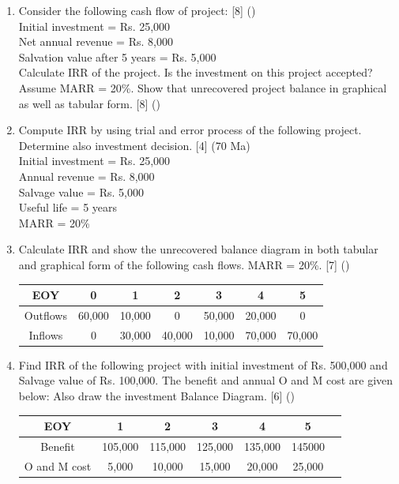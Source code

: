 \documentclass[12pt]{article}
\begin{document}
\begin{enumerate}
				\item Consider the following cash flow of project: \hfill [8] ()\\
				Initial investment = Rs. 25,000\\
				Net annual revenue = Rs. 8,000\\
				Salvation value after 5 years = Rs. 5,000\\
				Calculate IRR of the project. Is the investment on this project accepted?\\
				Assume MARR = 20\%. Show that unrecovered project balance in graphical as well as tabular form. \hfill [8] ()

				\item Compute IRR by using trial and error process of the following project. Determine also investment decision. \hfill [4] (70 Ma)\\
				Initial investment = Rs. 25,000\\
				Annual revenue = Rs. 8,000\\
				Salvage value = Rs. 5,000\\
				Useful life = 5 years\\
				MARR = 20\%	
				
				\item Calculate IRR and show the unrecovered balance diagram in both tabular and graphical form of the following cash flows. MARR = 20\%. \hfill [7] ()
				\begin{tabular}{|c|c|c|c|c|c|c|}
					\hline
					EOY & 0 & 1 & 2 & 3 & 4 & 5\\ \hline
					Outflows & 60,000 & 10,000 & 0 & 50,000 & 20,000 & 0\\ \hline
					Inflows & 0 & 30,000 & 40,000 & 10,000 & 70,000 & 70,000\\ \hline
				\end{tabular}
				
				\item Find IRR of the following project with initial investment of Rs. 500,000 and Salvage value of Rs. 100,000. The benefit and annual O and M cost are given below: Also draw the investment Balance Diagram. \hfill [6] ()\\
				\begin{tabular}{|c|c|c|c|c|c|c|}
					\hline
					EOY & 1 & 2 & 3 & 4 & 5\\ \hline
					Benefit & 105,000 & 115,000 & 125,000 & 135,000 & 145000 \\ \hline
					O and M cost & 5,000 & 10,000 & 15,000 & 20,000 & 25,000 \\ \hline
				\end{tabular}
				

\end{enumerate}
\end{document}
